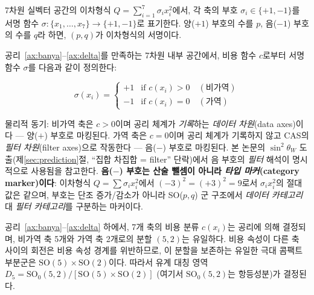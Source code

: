 \documentclass[entropy,article,submit,pdftex,oneauthor]{Definitions/mdpi}
\begin{document}
\begin{Definition}[서명 함수]
7차원 실벡터 공간의 이차형식 $Q = \sum_{i=1}^{7} \sigma_i x_i^2$에서, 각 축의 부호 $\sigma_i \in \{+1, -1\}$를 서명 함수 $\sigma: \{x_1, \ldots, x_7\} \to \{+1, -1\}$로 표기한다. 양($+1$) 부호의 수를 $p$, 음($-1$) 부호의 수를 $q$라 하면, $(p,q)$가 이차형식의 서명이다.
\end{Definition}

\begin{Definition}[비용--서명 사상]\label{def:cost-sig}
공리~\ref{ax:banya}--\ref{ax:delta}를 만족하는 7차원 내부 공간에서, 비용 함수 $c$로부터 서명 함수 $\sigma$를 다음과 같이 정의한다:
\begin{linenomath}
\begin{equation}
\sigma(x_i) = \begin{cases} +1 & \text{if } c(x_i) > 0 \quad (\text{비가역}) \\ -1 & \text{if } c(x_i) = 0 \quad (\text{가역}) \end{cases}
\label{eq:cost-sig}
\end{equation}
\end{linenomath}
물리적 동기: 비가역 축은 $c > 0$이며 공리 체계가 \emph{기록}하는 \emph{데이터 차원}(data axes)이다 --- 양($+$) 부호로 마킹된다. 가역 축은 $c = 0$이며 공리 체계가 기록하지 않고 CAS의 \emph{필터 차원}(filter axes)으로 작동한다 --- 음($-$) 부호로 마킹된다. 본 논문의 $\sin^2\theta_W$ 도출(제\ref{sec:prediction}절, ``집합 차집합 = filter'' 단락)에서 음 부호의 \emph{필터} 해석이 명시적으로 사용됨을 참고한다. \textbf{음($-$) 부호는 산술 뺄셈이 아니라 \emph{타입 마커}(category marker)이다}: 이차형식 $Q = \sum \sigma_i x_i^2$에서 $(-3)^2 = (+3)^2 = 9$로서 $\sigma_i x_i^2$의 절대값은 같으며, 부호는 단조 증가/감소가 아니라 SO($p,q$) 군 구조에서 \emph{데이터 카테고리} 대 \emph{필터 카테고리}를 구분하는 마커이다.
\end{Definition}

\begin{Theorem}\label{thm:cost-signature}
공리~\ref{ax:banya}--\ref{ax:delta} 하에서, 7개 축의 비용 분류 $c(x_i)$는 공리에 의해 결정되며, 비가역 축 5개와 가역 축 2개로의 분할 $(5,2)$는 유일하다. 비용 속성이 다른 축 사이의 회전은 비용 속성 경계를 위반하므로, 이 분할을 보존하는 유일한 극대 콤팩트 부분군은 $\mathrm{SO}(5) \times \mathrm{SO}(2)$이다. 따라서 유계 대칭 영역 $D_5 = \mathrm{SO}_0(5,2)/[\mathrm{SO}(5) \times \mathrm{SO}(2)]$ (여기서 $\mathrm{SO}_0(5,2)$는 항등성분)가 결정된다.
\end{Theorem}
\end{document}
